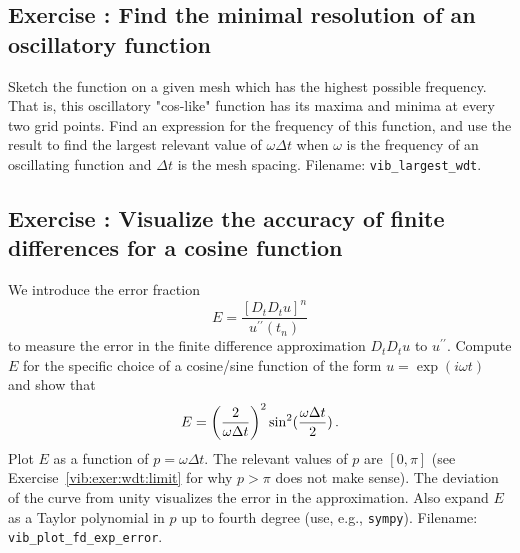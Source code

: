 \documentclass[%
oneside,                 %
final,                   %
10pt]{article}
\newenvironment{doconceexercise}{}{}
\newcounter{doconceexercisecounter}
\begin{document}
\begin{doconceexercise}

\subsection*{Exercise \thedoconceexercisecounter: Find the minimal resolution of an oscillatory function}

\label{vib:exer:wdt:limit}



Sketch the function on a given mesh which has the highest possible
frequency. That is, this oscillatory "cos-like" function has its
maxima and minima at every two grid points.  Find an expression for
the frequency of this function, and use the result to find the largest
relevant value of $\omega\Delta t$ when $\omega$ is the frequency
of an oscillating function and $\Delta t$ is the mesh spacing.
\noindent Filename: \Verb!vib_largest_wdt!.

\end{doconceexercise}




\begin{doconceexercise}

\subsection*{Exercise \thedoconceexercisecounter: Visualize the accuracy of finite differences for a cosine function}

\label{vib:exer:fd:exp:plot}



We introduce the error fraction
\[ E = \frac{[D_tD_t u]^n}{u^{\prime\prime}(t_n)} \]
to measure the error in the finite difference approximation $D_tD_tu$ to
$u^{\prime\prime}$.
Compute $E$
for the specific choice of a cosine/sine function of the
form $u=\exp{(i\omega t)}$ and show that
\[ E = \left(\frac{2}{\omega\Delta t}\right)^2
\sin^2(\frac{\omega\Delta t}{2})
\tp
\]
Plot $E$ as a function of $p=\omega\Delta t$. The relevant
values of $p$ are $[0,\pi]$ (see Exercise~\ref{vib:exer:wdt:limit}
for why $p>\pi$ does not make sense).
The deviation of the curve from unity visualizes the error in the
approximation. Also expand $E$ as a Taylor polynomial in $p$ up to
fourth degree (use, e.g., \texttt{sympy}).
\noindent Filename: \Verb!vib_plot_fd_exp_error!.

\end{doconceexercise}
\end{document}
